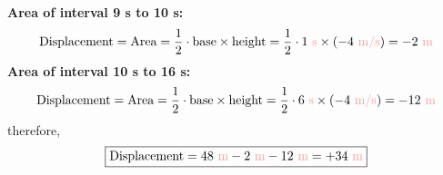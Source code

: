 \documentclass[A4,12pt]{article}
\begin{document}
\begin{enumerate}[label=\bfseries (\arabic*)]
\begin{itemize}
\begin{example}
\begin{figure}[H]
    \end{figure}
    {\bf Area of interval 9 s to 10 s:}
    \begin{equation*}
       \text{Displacement}=\text{Area}=\frac{1}{2}\cdot \text{base}\times\text{height}=\frac{1}{2}\cdot\tsis{1}\times(\vsis{-4})=\msis{-2}
    \end{equation*}
    {\bf Area of interval 10 s to 16 s:}
    \begin{equation*}
       \text{Displacement}=\text{Area}=\frac{1}{2}\cdot \text{base}\times\text{height}=\frac{1}{2}\cdot\tsis{6}\times(\vsis{-4})=\msis{-12}
    \end{equation*}
    therefore,
    \begin{equation*}
       \boxed{\text{Displacement}=\msis{48}-\msis{2}-\msis{12}=\msis{+34}}
    \end{equation*}
    \end{example}
\end{itemize}
    
















\end{enumerate}
\end{document}
